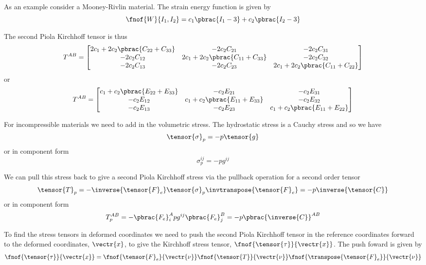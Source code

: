 As an example consider a Mooney-Rivlin material. The strain energy function is
given by
\begin{equation}
  \fnof{W}{I_{1},I_{2}}=c_{1}\pbrac{I_{1}-3}+c_{2}\pbrac{I_{2}-3}
\end{equation}

The second Piola Kirchhoff tensor is thus
\begin{equation}
  T^{AB}=\begin{bmatrix}
    2c_{1}+2c_{2}\pbrac{C_{22}+C_{33}} & -2c_{2}C_{21} & -2c_{2}C_{31} \\
    -2c_{2}C_{12} & 2c_{1}+2c_{2}\pbrac{C_{11}+C_{33}} & -2c_{2}C_{32} \\
    -2c_{2}C_{13} & -2c_{2}C_{23} & 2c_{1}+2c_{2}\pbrac{C_{11}+C_{22}}
  \end{bmatrix}
\end{equation}
or
\begin{equation}
  T^{AB}=\begin{bmatrix}
    c_{1}+c_{2}\pbrac{E_{22}+E_{33}} & -c_{2}E_{21} & -c_{2}E_{31} \\
    -c_{2}E_{12} & c_{1}+c_{2}\pbrac{E_{11}+E_{33}} & -c_{2}E_{32} \\
    -c_{2}E_{13} & -c_{2}E_{23} & c_{1}+c_{2}\pbrac{E_{11}+E_{22}}
  \end{bmatrix}
\end{equation}

For incompressible materials we need to add in the volumetric stress. The
hydrostatic stress is a Cauchy stress and so we have
\begin{equation}
  \tensor{\sigma}_{p} = -p\tensor{g}
\end{equation}
or in component form
\begin{equation}
  \sigma_{p}^{ij} = -p g^{ij}
\end{equation}

We can pull this stress back to give a second Piola Kirchhoff stress via the
pullback operation for a second order tensor \ie
\begin{equation}
  \tensor{T}_{p}=
  -\inverse{\tensor{F}_{e}}\tensor{\sigma}_{p}\invtranspose{\tensor{F}_{e}} = -p\inverse{\tensor{C}}
\end{equation}
or in component form
\begin{equation}
  T_{p}^{AB}=-\pbrac{F_{e}}^{A}_{i}p g^{ij}\pbrac{F_{e}}^{B}_{j}=-p\pbrac{\inverse{C}}^{AB}
\end{equation}

To find the stress tensors in deformed coordinates we need to push the second
Piola Kirchhoff tensor in the reference coordinates forward to the deformed
coordinates, $\vectr{x}$, to give the Kirchhoff stress tensor,
$\fnof{\tensor{\tau}}{\vectr{x}}$. The push foward is given by
\begin{equation}
  \fnof{\tensor{\tau}}{\vectr{x}}=\fnof{\tensor{F}_{e}}{\vectr{\nu}}\fnof{\tensor{T}}{\vectr{\nu}}
  \fnof{\transpose{\tensor{F}_{e}}}{\vectr{\nu}}
\end{equation}

